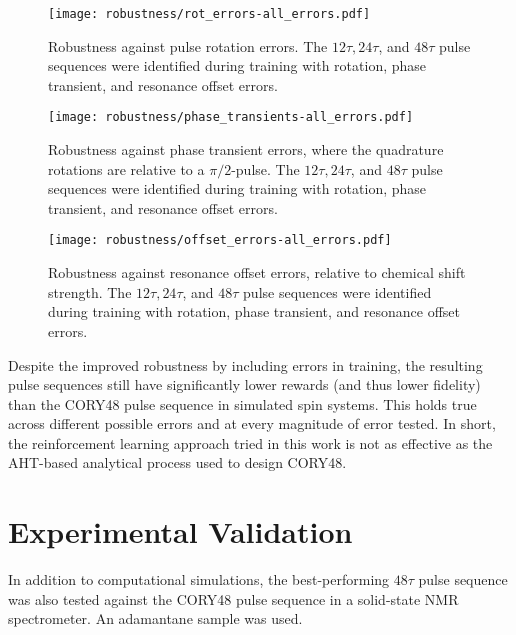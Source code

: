 \begin{figure}[H]
    \centering
    \texttt{[image: robustness/rot\_errors-all\_errors.pdf]}
    \caption{
    Robustness against pulse rotation errors. The $12\tau, 24\tau$, and $48\tau$ pulse sequences were identified during training with rotation, phase transient, and resonance offset errors.
    }
    \label{fig:rot_errors-all_errors}
\end{figure}

\begin{figure}[H]
    \centering
    \texttt{[image: robustness/phase\_transients-all\_errors.pdf]}
    \caption{
    Robustness against phase transient errors, where the quadrature rotations are relative to a $\pi/2$-pulse. The $12\tau, 24\tau$, and $48\tau$ pulse sequences were identified during training with rotation, phase transient, and resonance offset errors.
    }
    \label{fig:phase_transients-all_errors}
\end{figure}

\begin{figure}[H]
    \centering
    \texttt{[image: robustness/offset\_errors-all\_errors.pdf]}
    \caption{
    Robustness against resonance offset errors, relative to chemical shift strength. The $12\tau, 24\tau$, and $48\tau$ pulse sequences were identified during training with rotation, phase transient, and resonance offset errors.
    }
    \label{fig:offset_errors-all_errors}
\end{figure}

Despite the improved robustness by including errors in training, the resulting pulse sequences still have significantly lower rewards (and thus lower fidelity) than the CORY48 pulse sequence in simulated spin systems. This holds true across different possible errors and at every magnitude of error tested. In short, the reinforcement learning approach tried in this work is not as effective as the AHT-based analytical process used to design CORY48.



\section{Experimental Validation}

In addition to computational simulations, the best-performing $48\tau$ pulse sequence was also tested against the CORY48 pulse sequence in a solid-state NMR spectrometer.
An adamantane sample was used.

